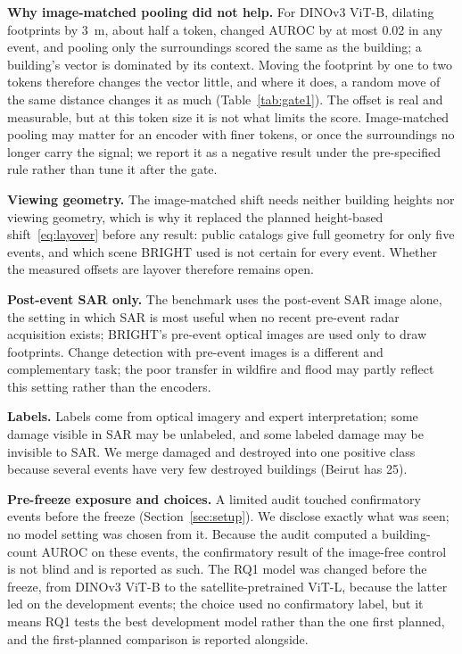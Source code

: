 \documentclass[journal]{IEEEtran}
\begin{document}
\textbf{Why image-matched pooling did not help.} For DINOv3 ViT-B, dilating footprints by 3~m, about half a token, changed AUROC by at most 0.02 in any event, and pooling only the surroundings scored the same as the building; a building's vector is dominated by its context. Moving the footprint by one to two tokens therefore changes the vector little, and where it does, a random move of the same distance changes it as much (Table~\ref{tab:gate1}). The offset is real and measurable, but at this token size it is not what limits the score. Image-matched pooling may matter for an encoder with finer tokens, or once the surroundings no longer carry the signal; we report it as a negative result under the pre-specified rule rather than tune it after the gate.

\textbf{Viewing geometry.} The image-matched shift needs neither building heights nor viewing geometry, which is why it replaced the planned height-based shift~\eqref{eq:layover} before any result: public catalogs give full geometry for only five events, and which scene BRIGHT used is not certain for every event. Whether the measured offsets are layover therefore remains open.

\textbf{Post-event SAR only.} The benchmark uses the post-event SAR image alone, the setting in which SAR is most useful when no recent pre-event radar acquisition exists; BRIGHT's pre-event optical images are used only to draw footprints. Change detection with pre-event images is a different and complementary task; the poor transfer in wildfire and flood may partly reflect this setting rather than the encoders.

\textbf{Labels.} Labels come from optical imagery and expert interpretation; some damage visible in SAR may be unlabeled, and some labeled damage may be invisible to SAR. We merge damaged and destroyed into one positive class because several events have very few destroyed buildings (Beirut has 25).

\textbf{Pre-freeze exposure and choices.} A limited audit touched confirmatory events before the freeze (Section~\ref{sec:setup}). We disclose exactly what was seen; no model setting was chosen from it. Because the audit computed a building-count AUROC on these events, the confirmatory result of the image-free control is not blind and is reported as such. The RQ1 model was changed before the freeze, from DINOv3 ViT-B to the satellite-pretrained ViT-L, because the latter led on the development events; the choice used no confirmatory label, but it means RQ1 tests the best development model rather than the one first planned, and the first-planned comparison is reported alongside.
\end{document}
